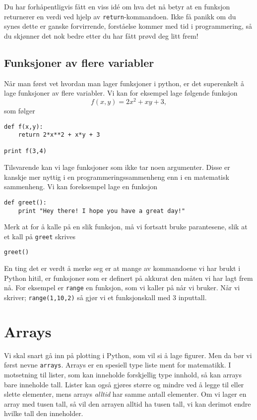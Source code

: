 \documentclass[a4paper, 11pt, notitlepage, english]{article}
\begin{document}
Du har forhåpentligvis fått en viss idé om hva det nå betyr at en funksjon returnerer en verdi ved hjelp av \verb+return+-kommandoen. Ikke få panikk om du synes dette er ganske forvirrende, forståelse kommer med tid i programmering, så du skjønner det nok bedre etter du har fått prøvd deg litt frem!

\subsection{Funksjoner av flere variabler}
Når man først vet hvordan man lager funksjoner i python, er det superenkelt å lage funksjoner av flere variabler. Vi kan for eksempel lage følgende funksjon
$$f(x,y) = 2x^2 + xy + 3,$$
som følger
\begin{lstlisting}
def f(x,y):
    return 2*x**2 + x*y + 3

print f(3,4)
\end{lstlisting}
\vspace{-0.3cm}
Tilsvarende kan vi lage funksjoner som ikke tar noen argumenter. Disse er kanskje mer nyttig i en programmeringssammenheng enn i en matematisk sammenheng. Vi kan foreksempel lage en funksjon
\begin{lstlisting}
def greet():
    print "Hey there! I hope you have a great day!"
\end{lstlisting}
\vspace{-0.3cm}
Merk at for å kalle på en slik funksjon, må vi fortsatt bruke parantesene, slik at et kall på \verb+greet+ skrives
\begin{lstlisting}
greet()
\end{lstlisting}

En ting det er verdt å merke seg er at mange av kommandoene vi har brukt i Python hitil, er funksjoner som er definert på akkurat den måten vi har lagt frem nå. For eksempel er \verb+range+ en funksjon, som vi kaller på når vi bruker. Når vi skriver; \verb+range(1,10,2)+ så gjør vi et funksjonskall med 3 inputtall.

\clearpage

\section{Arrays}

Vi skal snart gå inn på plotting i Python, som vil si å lage figurer. Men da bør vi først nevne \verb+arrays+. Arrays er en spesiell type liste ment for matematikk. I motsetning til lister, som kan inneholde forskjellig type innhold, så kan arrays bare inneholde tall. Lister kan også gjøres større og mindre ved å legge til eller slette elementer, mens arrays \emph{alltid} har samme antall elementer. Om vi lager en array med tusen tall, så vil den arrayen alltid ha tusen tall, vi kan derimot endre hvilke tall den inneholder.
\end{document}
